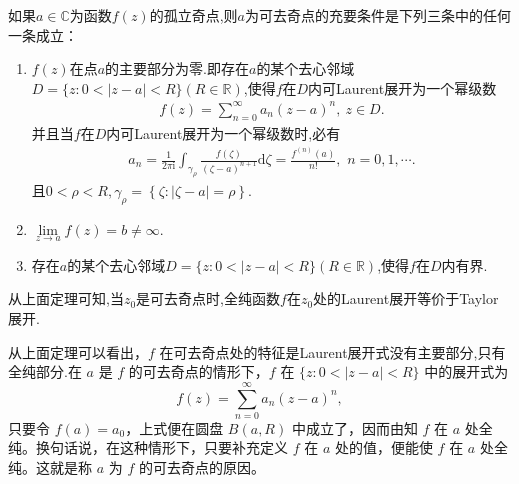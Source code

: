 \documentclass[../../main.tex]{subfiles}%
\begin{document}
\begin{theorem}[Riemann定理]\label{theorem:Riemann定理-定理5.2.1}
如果$a\in \mathbb{C}$为函数$f(z)$的孤立奇点,则$a$为可去奇点的充要条件是下列三条中的任何一条成立：
\begin{enumerate}[(1)]
\item $f(z)$在点$a$的主要部分为零.即存在$a$的某个去心邻域$D=\{z:0<|z-a|<R\}(R\in \mathbb{R})$,使得\( f \)在$D$内可Laurent展开为一个幂级数
\begin{align*}
f(z)=\sum_{n=0}^{\infty}{a_n\left( z-a \right) ^n},\ z\in D.
\end{align*}
并且当$f$在$D$内可Laurent展开为一个幂级数时,必有
\begin{align*}
a_n=\frac{1}{2\pi \mathrm{i}}\int_{\gamma _{\rho}}{\frac{f\left( \zeta \right)}{\left( \zeta -a \right) ^{n+1}}\mathrm{d}\zeta}=\frac{f^{\left( n \right)}\left( a \right)}{n!},\,\,n=0,1,\cdots .
\end{align*}
且$0<\rho <R,\gamma _{\rho}=\left\{ \zeta :\left| \zeta -a\right|=\rho \right\} .$

\item $\lim\limits_{z \to a}f(z)=b\neq\infty$.

\item 存在$a$的某个去心邻域$D=\{z:0<|z-a|<R\}(R\in \mathbb{R})$,使得\( f \)在$D$内有界.
\end{enumerate}
\end{theorem}
\begin{remark}
从上面定理可知,当$z_0$是可去奇点时,全纯函数$f$在$z_0$处的Laurent展开等价于Taylor展开.
\end{remark}
\begin{remark}
从上面定理可以看出，\( f \) 在可去奇点处的特征是Laurent展开式没有主要部分,只有全纯部分.在 \( a\) 是 \( f \) 的可去奇点的情形下，\( f \) 在 \( \{ z: 0 < |z - a| < R \} \) 中的展开式为
\[
f(z) = \sum_{n = 0}^{\infty} a_n (z - a)^n,
\]
只要令 \( f(a) = a_0 \)，上式便在圆盘 \( B(a,R) \) 中成立了，因而由知 \( f \) 在 \( a \) 处全纯。换句话说，在这种情形下，只要补充定义 \( f \) 在 \( a \) 处的值，便能使 \( f \) 在 \(a \) 处全纯。这就是称 \(a\) 为 \( f \) 的可去奇点的原因。
\end{remark}
\end{document}
